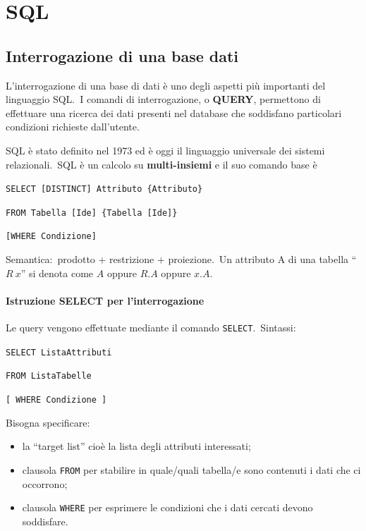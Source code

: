 \chapter{SQL}

\section{Interrogazione di una base dati}
L'interrogazione di una base di dati è uno degli aspetti più importanti del linguaggio SQL.\
I comandi di interrogazione, o \textbf{QUERY}, permettono di effettuare una ricerca dei dati presenti nel database che soddisfano particolari condizioni richieste dall'utente.

SQL è stato definito nel 1973 ed è oggi il linguaggio universale dei sistemi relazionali.\
SQL è un calcolo su \textbf{multi-insiemi} e il suo comando base è
\begin{flushleft}
	\texttt{SELECT [DISTINCT] Attributo \{Attributo\}}

	\quad \texttt{FROM Tabella [Ide] \{Tabella [Ide]\}}

	\quad \texttt{[WHERE Condizione]}
\end{flushleft}

\noindent Semantica:\ prodotto + restrizione + proiezione.\
Un attributo A di una tabella ``$R\ x$'' si denota come $A$ oppure $R.A$ oppure $x.A$.

\subsubsection{Istruzione SELECT per l'interrogazione}

Le query vengono effettuate mediante il comando \texttt{SELECT}.\
Sintassi:
\begin{flushleft}
	\texttt{SELECT ListaAttributi}

	\texttt{FROM ListaTabelle}

	\texttt{[ WHERE Condizione ]}
\end{flushleft}

\noindent Bisogna specificare:
\begin{itemize}
	\item la ``target list'' cioè la lista degli attributi interessati;
	\item clausola \texttt{FROM} per stabilire in quale/quali tabella/e sono contenuti i dati che ci occorrono;
	\item clausola \texttt{WHERE} per esprimere le condizioni che i dati cercati devono soddisfare.
\end{itemize}

